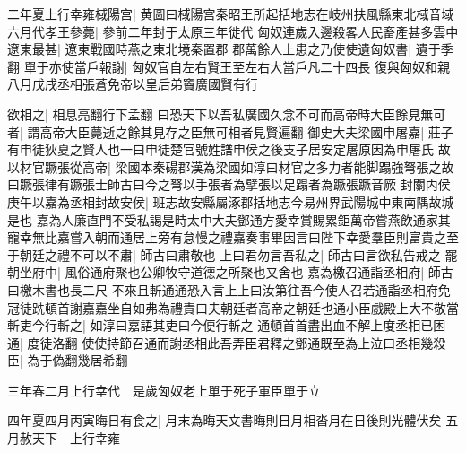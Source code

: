 二年夏上行幸雍棫陽宫|{
	黄圖曰棫陽宫秦昭王所起括地志在岐州扶風縣東北棫音域}
六月代孝王參薨|{
	參前二年封于太原三年徙代}
匈奴連歲入邊殺畧人民畜產甚多雲中遼東最甚|{
	遼東戰國時燕之東北境秦置郡}
郡萬餘人上患之乃使使遺匈奴書|{
	遺于季翻}
單于亦使當戶報謝|{
	匈奴官自左右賢王至左右大當戶凡二十四長}
復與匈奴和親八月戊戌丞相張蒼免帝以皇后弟竇廣國賢有行

欲相之|{
	相息亮翻行下孟翻}
曰恐天下以吾私廣國久念不可而高帝時大臣餘見無可者|{
	謂高帝大臣薨逝之餘其見存之臣無可相者見賢遍翻}
御史大夫梁國申屠嘉|{
	莊子有申徒狄夏之賢人也一曰申徒楚官號姓譜申侯之後支子居安定屠原因為申屠氏}
故以材官蹶張從高帝|{
	梁國本秦碭郡漢為梁國如淳曰材官之多力者能脚蹋強弩張之故曰蹶張律有蹶張士師古曰今之弩以手張者為擘張以足蹋者為蹶張蹶音厥}
封關内侯庚午以嘉為丞相封故安侯|{
	班志故安縣屬涿郡括地志今易州界武陽城中東南隅故城是也}
嘉為人廉直門不受私謁是時太中大夫鄧通方愛幸賞賜累鉅萬帝嘗燕飲通家其寵幸無比嘉嘗入朝而通居上旁有怠慢之禮嘉奏事畢因言曰陛下幸愛羣臣則富貴之至于朝廷之禮不可以不肅|{
	師古曰肅敬也}
上曰君勿言吾私之|{
	師古曰言欲私告戒之}
罷朝坐府中|{
	風俗通府聚也公卿牧守道德之所聚也又舍也}
嘉為檄召通詣丞相府|{
	師古曰檄木書也長二尺}
不來且斬通通恐入言上上曰汝第往吾今使人召若通詣丞相府免冠徒跣頓首謝嘉嘉坐自如弗為禮責曰夫朝廷者高帝之朝廷也通小臣戲殿上大不敬當斬吏今行斬之|{
	如淳曰嘉語其吏曰今便行斬之}
通頓首首盡出血不解上度丞相已困通|{
	度徒洛翻}
使使持節召通而謝丞相此吾弄臣君釋之鄧通既至為上泣曰丞相幾殺臣|{
	為于偽翻幾居希翻}


三年春二月上行幸代　是歲匈奴老上單于死子軍臣單于立

四年夏四月丙寅晦日有食之|{
	月末為晦天文書晦則日月相沓月在日後則光體伏矣}
五月赦天下　上行幸雍


